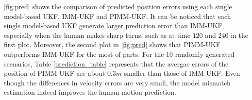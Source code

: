 \documentclass[journal]{IEEEtran}
\newcommand{\todohere}[1]{\hl{(\textbf{TODO:} #1)}}
\DeclareRobustCommand{\dhnote}[1]{\ifthenelse{\boolean{include-notes}}%
{\textcolor{blue}{\textbf{DH: #1}}}{}}
\begin{document}
    	\cref{fig:pred} shows the comparison of predicted position errors using each single model-based UKF, IMM-UKF and PIMM-UKF.
	It can be noticed that each single model-based UKF generate larger prediction error than IMM-UKF, especially when the human makes sharp turns, such as at time $120$ and $240$ in the first plot.
Moreover, the second plot in \cref{fig:pred} shows that PIMM-UKF outperforms IMM-UKF for the most of parts. For the $10$ randomly generated scenarios, Table \ref{prediction_table} represents that the avergae errors of the position of PIMM-UKF are about $0.3m$ smaller than those of IMM-UKF. Even though the differences in velocity errors are very small, the model mismatch estimation indeed improves the human motion prediction. 
      
\end{document}
